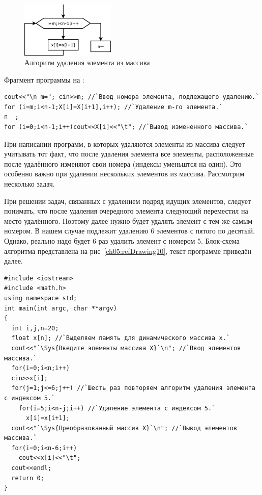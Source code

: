 \begin{figure}[htb]
\begin{center}
\includegraphics[width=0.4\textwidth]{img/ris_5_10}
\caption{Алгоритм удаления элемента из массива}
\label{ch05:refDrawing9}
\end{center}
\end{figure}

Фрагмент программы на :
\begin{lstlisting}
cout<<"\n m="; cin>>m; //`Ввод номера элемента, подлежащего удалению.` 
for (i=m;i<n-1;X[i]=X[i+1],i++); //`Удаление m-го элемента.`
n--;
for (i=0;i<n-1;i++)cout<<X[i]<<"\t"; //`Вывод измененного массива.`
\end{lstlisting}

При написании программ, в которых удаляются элементы из массива следует учитывать тот факт, что после удаления элемента
все элементы, расположенные после удалённого изменяют свои номера (индексы уменьштся на один). Это особенно важно
при удалении нескольких элементов из массива. Рассмотрим несколько задач.


При решении задач, связанных с удалением подряд идущих элементов, следует понимать, что после удаления очередного
элемента следующий переместил на место удалённого. Поэтому далее нужно будет удалять элемент с тем же самым номером. В
нашем случае подлежит удалению 6 элементов с пятого по десятый. Однако, реально надо будет 6 раз удалить элемент с
номером 5. Блок-схема алгоритма представлена на рис~\ref{ch05:refDrawing10}, текст программе приведён далее.
\begin{lstlisting}
#include <iostream>
#include <math.h>
using namespace std;
int main(int argc, char **argv)
{
  int i,j,n=20;
  float x[n]; //`Выделяем память для динамического массива x.`
  cout<<"`\Sys{Введите элементы массива X}`\n"; //`Ввод элементов массива.`
  for(i=0;i<n;i++)
  cin>>x[i];
  for(j=1;j<=6;j++) //`Шесть раз повторяем алгоритм удаления элемента с индексом 5.`
    for(i=5;i<n-j;i++) //`Удаление элемента с индексом 5.`
      x[i]=x[i+1];
  cout<<"`\Sys{Преобразованный массив X}`\n"; //`Вывод элементов массива.`
  for(i=0;i<n-6;i++)
    cout<<x[i]<<"\t";
  cout<<endl;
  return 0;
}
\end{lstlisting}

